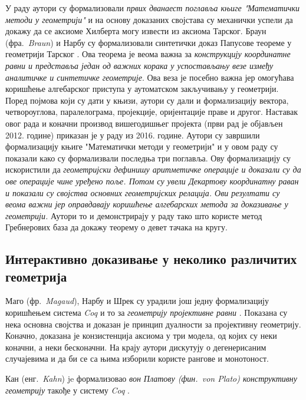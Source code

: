 У раду \cite{braun2012tarski} аутори су формализовали \emph{првих
  дванаест поглавља књиге "Математички методи у геометрији"}
\cite{tarski} и на основу доказаних својстава су механички успели да
докажу да се аксиоме Хилберта могу извести из аксиома Тарског. Браун
(фра.~\emph{Braun}) и Нарбу су формализовали синтетички доказ Папусове
теореме у геометрији Тарског \cite{braun2015synthetic}. Ова теорема је
веома важна за \emph{конструкцију координатне равни и представља један
  од важних корака у успостављању везе између аналитичке и синтетичке
  геометрије}. Ова веза је посебно важна јер омогућава коришћење
алгебарског приступа у аутоматском закључивању у геометрији. Поред
појмова који су дати у књизи, аутори су дали и формализацију вектора,
четвороуглова, паралелограма, пројекције, оријентације праве и
другог. Наставак овог рада и коначни производ вишегодишњег пројекта
(први рад је објављен 2012. године) приказан је у раду
\cite{boutry2016tarski} из 2016. године. Аутори су завршили
формализацију књиге "Математички методи у геометрији" и у овом раду су
показали како су формализвали последња три поглавља. Ову формализацију
су искористили да \emph{геометријски дефинишу аритметичке операције и
  доказали су да ове операције чине уређено поље. Потом су увели
  Декартову координатну раван и показали су својства основних
  геометријских релација. Ови резултати су веома важни јер оправдавају
  коришћење алгебарских метода за доказивање у геометрији.} Аутори то
и демонстрирају у раду тако што користе метод Гребнерових база да
докажу теорему о девет тачака на кругу.

\subsection{Интерактивно доказивање у неколико различитих геометрија}

Маго (фр.~\emph{Magaud}), Нарбу и Шрек су урадили још једну
формализацију коришћењем система \emph{Coq} и то за \emph{геометрију
  пројективне равни} \cite{projective-coq1,projective-coq2}. Показана
су нека основна својства и доказан је принцип дуалности за пројективну
геометрију. Коначно, доказана је конзистенција аксиома у три модела,
од којих су неки коначни, а неки бесконачни. На крају аутори дискутују
о дегенерисаним случајевима и да би се са њима изборили користе
рангове и монотоност.

Кан (енг.~\emph{Kahn}) je формализовао \emph{вон Платову
  (фин.~\emph{von Plato}) конструктивну геометрију} такође у систему
\emph{Coq} \cite{vonPlato,von-plato-formalization}.

